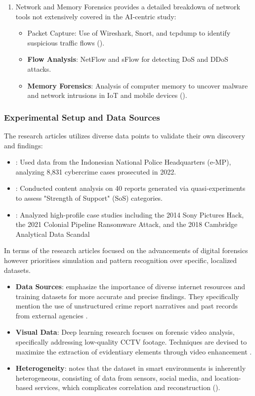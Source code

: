 \documentclass[12pt,a4paper]{article}
\begin{document}
\begin{enumerate}
\item Network and Memory Forensics
\cite{alenezi2023digital} provides a detailed breakdown of network tools not extensively covered in the AI-centric \cite{vaddi2024enhancements} study:
\begin{itemize}
\item Packet Capture: Use of Wireshark, Snort, and tcpdump to identify suspicious traffic flows (\cite{alenezi2023digital}).
\item \textbf{Flow Analysis}: NetFlow and sFlow for detecting DoS and DDoS attacks.
\item \textbf{Memory Forensics}: Analysis of computer memory to uncover malware and network intrusions in IoT and mobile devices (\cite{alenezi2023digital}).
\end{itemize}
\end{enumerate}


\subsubsection{Experimental Setup and Data Sources}
The research articles utilizes diverse data points to validate their own discovery and findings:
\begin{itemize}
\item \cite{ilyas2024role}: Used data from the Indonesian National Police Headquarters (e-MP), analyzing 8,831 cybercrime cases prosecuted in 2022.
\item \cite{sharma2024digital}: Conducted content analysis on 40 reports generated via quasi-experiments to assess "Strength of Support" (SoS) categories.
\item \cite{hassan2025}: Analyzed high-profile case studies including the 2014 Sony Pictures Hack, the 2021 Colonial Pipeline Ransomware Attack, and the 2018 Cambridge Analytical Data Scandal 
\end{itemize}

In terms of the research articles focused on the advancements of digital forensics however prioritises simulation and pattern recognition over specific, localized datasets.

\begin{itemize}
\item \textbf{Data Sources}: \cite{vaddi2024enhancements} emphasize the importance of diverse internet resources and training datasets for more accurate and precise findings. They specifically mention the use of unstructured crime report narratives and past records from external agencies \cite{vaddi2024enhancements}.
\item \textbf{Visual Data}: Deep learning research focuses on forensic video analysis, specifically addressing low-quality CCTV footage. Techniques are devised to maximize the extraction of evidentiary elements through video enhancement \cite{vaddi2024enhancements}.
\item \textbf{Heterogeneity}: \cite{alenezi2023digital} notes that the dataset in smart environments is inherently heterogeneous, consisting of data from sensors, social media, and location-based services, which complicates correlation and reconstruction (\cite{alenezi2023digital}).
\end{itemize}
\end{document}
